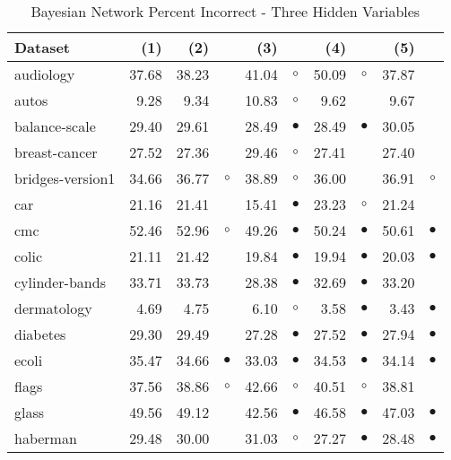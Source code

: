 \begin{table}[thb]
\caption{\label{bnpi3}Bayesian Network Percent Incorrect - Three Hidden Variables}
\footnotesize
{\centering \begin{tabular}{lrr@{\hspace{0.1cm}}cr@{\hspace{0.1cm}}cr@{\hspace{0.1cm}}cr@{\hspace{0.1cm}}c}
\\
\hline
Dataset & (1)& (2) & & (3) & & (4) & & (5) & \\
\hline
audiology & 37.68 & 38.23 &           & 41.04 &   $\circ$ & 50.09 &   $\circ$ & 37.87 &          \\
autos &  9.28 &  9.34 &           & 10.83 &   $\circ$ &  9.62 &           &  9.67 &          \\
balance-scale & 29.40 & 29.61 &           & 28.49 & $\bullet$ & 28.49 & $\bullet$ & 30.05 &          \\
breast-cancer & 27.52 & 27.36 &           & 29.46 &   $\circ$ & 27.41 &           & 27.40 &          \\
bridges-version1 & 34.66 & 36.77 &   $\circ$ & 38.89 &   $\circ$ & 36.00 &           & 36.91 &   $\circ$\\
car & 21.16 & 21.41 &           & 15.41 & $\bullet$ & 23.23 &   $\circ$ & 21.24 &          \\
cmc & 52.46 & 52.96 &   $\circ$ & 49.26 & $\bullet$ & 50.24 & $\bullet$ & 50.61 & $\bullet$\\
colic & 21.11 & 21.42 &           & 19.84 & $\bullet$ & 19.94 & $\bullet$ & 20.03 & $\bullet$\\
cylinder-bands & 33.71 & 33.73 &           & 28.38 & $\bullet$ & 32.69 & $\bullet$ & 33.20 &          \\
dermatology &  4.69 &  4.75 &           &  6.10 &   $\circ$ &  3.58 & $\bullet$ &  3.43 & $\bullet$\\
diabetes & 29.30 & 29.49 &           & 27.28 & $\bullet$ & 27.52 & $\bullet$ & 27.94 & $\bullet$\\
ecoli & 35.47 & 34.66 & $\bullet$ & 33.03 & $\bullet$ & 34.53 & $\bullet$ & 34.14 & $\bullet$\\
flags & 37.56 & 38.86 &   $\circ$ & 42.66 &   $\circ$ & 40.51 &   $\circ$ & 38.81 &          \\
glass & 49.56 & 49.12 &           & 42.56 & $\bullet$ & 46.58 & $\bullet$ & 47.03 & $\bullet$\\
haberman & 29.48 & 30.00 &           & 31.03 &   $\circ$ & 27.27 & $\bullet$ & 28.48 & $\bullet$\\

\end{tabular}}
\end{table}
